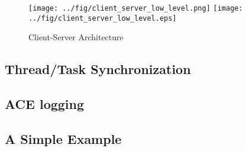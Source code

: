 \begin{figure}[!ht]
  \ifpdf
  \texttt{[image: ../fig/client\_server\_low\_level.png]}
  \else
  \texttt{[image: ../fig/client\_server\_low\_level.eps]}
  \fi
  \caption{Client-Server Architecture}
  \label{FIG_CLIENT_SERVER_ARCHITECTURE_LOW_LEVEL}
\end{figure}


\subsection{Thread/Task Synchronization}

\subsection{ACE logging}

\subsection{A Simple Example}



